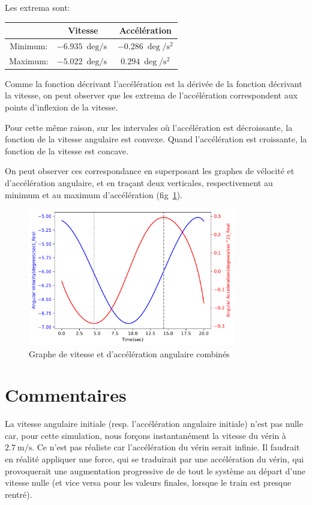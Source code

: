 \documentclass{article}
\begin{document}
Les extrema sont:
\begin{center}
    \begin{tabular}{|c|c|c|}
        \hline
        & Vitesse & Accélération\\
        \hline
        Minimum: & \( \SI{-6,935}{\deg\per\second} \) & \( \SI{-0.286}{\deg\per\second\squared} \)\\
        \hline
        Maximum: & \( \SI{-5.022}{\deg\per\second}\) & \( \SI{0.294}{\deg\per\second\squared} \)\\
        \hline
    \end{tabular}
\end{center}

Comme la fonction décrivant l'accélération est la dérivée de la fonction décrivant la vitesse, on peut observer que les extrema de l'accélération correspondent aux points d'inflexion de la vitesse.

Pour cette même raison, sur les intervales où l'accélération est décroissante, la fonction de la vitesse angulaire est convexe. Quand l'accélération est croissante, la fonction de la vitesse est concave.

On peut observer ces correspondance en superposant les graphes de vélocité et d'accélération angulaire, et en traçant deux verticales, respectivement au minimum et au maximum d'accélération (fig~\ref{fig:combined_vel_accel}).
\begin{figure}[h]
    \centering
    \includegraphics[height=6cm]{data/combined_vel_accel.pdf}
    \caption{Graphe de vitesse et d'accélération angulaire combinés}
    \label{fig:combined_vel_accel}
\end{figure}


\section{Commentaires}
La vitesse angulaire initiale (resp. l'accélération angulaire initiale) n'est pas nulle car, pour cette simulation, nous forçons instantanément la vitesse du vérin à \(\SI{2,7}{\meter\per\second}\). Ce n'est pas réaliste car l'accélération du vérin serait infinie. Il faudrait en réalité appliquer une force, qui se traduirait par une accélération du vérin, qui provoquerait une augmentation progressive de de tout le système au départ d'une vitesse nulle (et vice versa pour les valeurs finales, lorsque le train est presque rentré).
\end{document}
